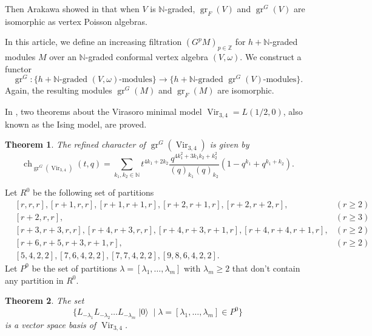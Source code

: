\documentclass[a4paper, 12pt, reqno]{amsart}
\newtheorem{theorem}{Theorem}[section]
\theoremstyle{remark}
\DeclareMathOperator{\Vir}{Vir}
\DeclareMathOperator{\gr}{gr}
\DeclareMathOperator{\ch}{ch}
\DeclareMathOperator{\vac}{|0\rangle}
\begin{document}
Then Arakawa showed in \cite[Proposition 2.6.1]{arakawa_remark_2012} that when $V$ is $\mathbb{N}$-graded, $\gr_F(V)$ and $\gr^G(V)$ are isomorphic as vertex Poisson algebras.

In this article, we define an increasing filtration $(G^pM)_{p \in \mathbb{Z}}$ for $h + \mathbb{N}$-graded modules $M$ over an $\mathbb{N}$-graded conformal vertex algebra $(V, \omega)$.
We construct a functor
\begin{equation*}
  \gr^G: \{\text{$h + \mathbb{N}$-graded $(V, \omega)$-modules}\} \to \{\text{$h + \mathbb{N}$-graded $\gr^G(V)$-modules}\}.
\end{equation*}
Again, the resulting modules $\gr^G(M)$ and $\gr_F(M)$ are isomorphic.

In \cite{andrews_singular_2022}, two theorems about the Virasoro minimal model $\Vir_{3, 4} = L(1/2, 0)$, also known as the Ising model, are proved.

\begin{theorem}
  \label{thr:1}
  The refined character of $\gr^G(\Vir_{3,4})$ is given by
  \begin{equation*}
    \ch_{\gr^G(\Vir_{3, 4})}(t, q) = \sum_{k_1, k_2 \in \mathbb{N}}t^{4k_1 + 2k_2}\frac{q^{4k_1^2 + 3k_1k_2 + k_2^2}}{(q)_{k_1}(q)_{k_2}}(1 - q^{k_1} + q^{k_1 + k_2}).
  \end{equation*}
\end{theorem}

Let $R^0$ be the following set of partitions
\begin{align*}
  &[r, r, r], [r + 1, r, r], [r + 1, r + 1, r], [r + 2, r + 1, r], [r + 2, r + 2, r], &(r \ge 2) \\
  &[r + 2, r, r], &(r \ge 3) \\
  &[r + 3, r + 3, r, r], [r + 4, r + 3, r, r],  [r + 4, r + 3, r + 1, r], [r + 4, r + 4, r + 1, r], &(r \ge 2) \\
  &[r + 6, r + 5, r + 3, r + 1, r], &(r \ge 2) \\
  &[5, 4, 2, 2], [7, 6, 4, 2, 2], [7, 7, 4, 2, 2], [9, 8, 6, 4, 2, 2].
\end{align*}
Let $P^0$ be the set of partitions $\lambda = [\lambda_1, \dots, \lambda_m]$ with $\lambda_m \ge 2$ that don't contain any partition in $R^0$.

\begin{theorem}
  \label{thr:2}
  The set
  \begin{equation*}
    \{L_{-\lambda_1}L_{-\lambda_2}\dots L_{-\lambda_m}\vac \mid \lambda = [\lambda_1, \dots, \lambda_m] \in P^0\}
  \end{equation*}
  is a vector space basis of $\Vir_{3, 4}$.
\end{theorem}
\end{document}
